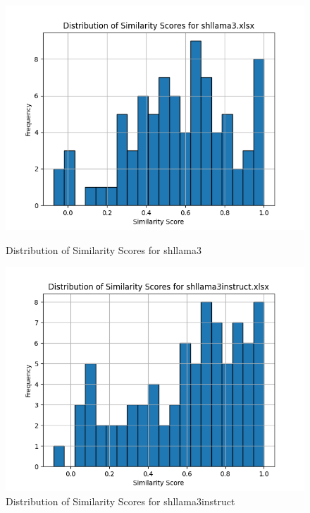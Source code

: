 \begin{figure}[H]
    \centering
    \begin{minipage}[b]{0.48\textwidth}
        \centering
        \includegraphics[width=\textwidth]{graphics/shllama3-semantic-distribution.png}
        \caption{Distribution of Similarity Scores for shllama3}
        \label{fig:shllama3}
    \end{minipage}
    \hfill
    \begin{minipage}[b]{0.48\textwidth}
        \centering
        \includegraphics[width=\textwidth]{graphics/shllama3instruct-semantic-distribution.png}
        \caption{Distribution of Similarity Scores for shllama3instruct}
        \label{fig:shllama3instruct}
    \end{minipage}

\end{figure}
